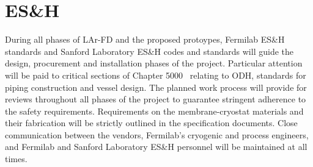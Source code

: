 \section{ES\&H}
\label{sec:cryo-cryosys-esh}

During all phases of LAr-FD and the proposed protoypes, Fermilab ES\&H standards and
Sanford Laboratory ES\&H codes and standards will guide the design, procurement and
installation phases of the project. Particular attention will be paid to critical sections of
Chapter 5000~\cite{feshm} relating to ODH, standards for piping construction and vessel design. The
planned work process will provide for reviews throughout all phases of the project to guarantee
stringent adherence to the safety requirements. Requirements on the membrane-cryostat
materials and their fabrication will be strictly outlined in the specification documents. Close
communication between the vendors, Fermilab's cryogenic and process engineers, and Fermilab and Sanford Laboratory ES\&H personnel will be maintained at all times.
